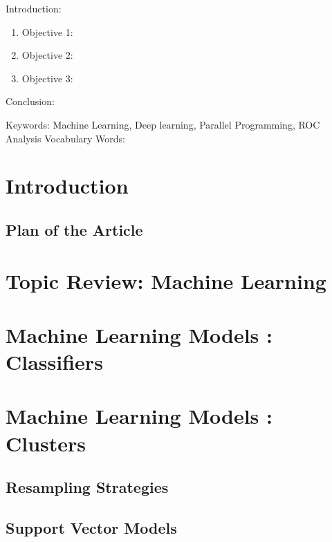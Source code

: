 

\twocolumn
\scriptsize
\begin{frontmatter}
		\title{}
		\author{}
		\address{The Mathematical Learning Space}
\end{frontmatter}	

Introduction:
\begin{enumerate}
\item Objective 1:
\item Objective 2:
\item Objective 3:
\end{enumerate}
Conclusion:

Keywords: Machine Learning, Deep learning, Parallel Programming, ROC Analysis 
Vocabulary Words:

\section{Introduction}

\subsection{Plan of the Article}

\section{Topic Review: Machine Learning}

\section{Machine Learning Models : Classifiers}

\section{Machine Learning Models : Clusters}

\subsection{Resampling Strategies}

\subsection{Support Vector Models}

